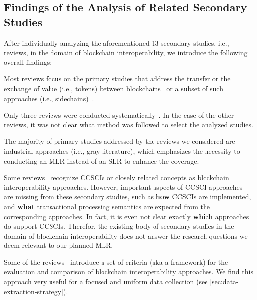 \documentclass[review]{elsarticle}
\begin{document}
\subsection{Findings of the Analysis of Related Secondary Studies}
After individually analyzing the aforementioned 13 secondary studies, i.e., reviews, in the domain of blockchain interoperability, we introduce the following overall findings:
\begin{list}{-}{}
	\item Most reviews focus on the primary studies that address the transfer or the exchange of value (i.e., tokens) between blockchains~\cite{Fridaus2020InteroperabilityReview,Siris2019,Bishnoi2020Interoperability,Qasse2019} or a subset of such approaches (i.e., sidechains)~\cite{Johnson2019Sidechains,Singh2020Sidechains}.
	\item Only three reviews were conducted systematically~\cite{belchior2020survey,Kannengießer2020,Singh2020Sidechains}.
	In the case of the other reviews, it was not clear what method was followed to select the analyzed studies.
	\item The majority of primary studies addressed by the reviews we considered are industrial approaches (i.e., gray literature), which emphasizes the necessity to conducting an MLR instead of an SLR to enhance the coverage.
	\item Some reviews~\cite{Qasse2019,Borkowski2019,Kannengießer2020,belchior2020survey} recognize CCSCIs or closely related concepts as blockchain interoperability approaches.
	However, important aspects of CCSCI approaches are missing from these secondary studies, such as \textbf{how} CCSCIs are implemented, and \textbf{what} transactional processing semantics are expected from the corresponding approaches.
	In fact, it is even not clear exactly \textbf{which} approaches do support CCSCIs.
	Therefor, the existing body of secondary studies in the domain of blockchain interoperability does not answer the research questions we deem relevant to our planned MLR.
	\item Some of the reviews~\cite{belchior2020survey,Koens2019Assessing,Kannengießer2020} introduce a set of criteria (aka a framework) for the evaluation and comparison of blockchain interoperability approaches.
	We find this approach very useful for a focused and uniform data collection (see \cref{sec:data-extraction-strategy}).
\end{list}
\end{document}
